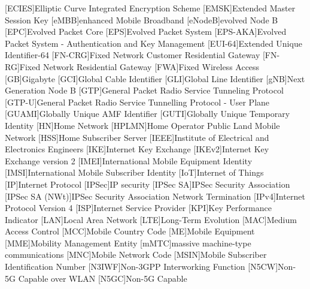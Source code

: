 \begin{multicols}{2}
\begin{acronym}[WPA]
        [ECIES]{Elliptic Curve Integrated Encryption Scheme}
        [EMSK]{Extended Master Session Key}
        [eMBB]{enhanced Mobile Broadband}
        [eNodeB]{evolved Node B}
        [EPC]{Evolved Packet Core}
        [EPS]{Evolved Packet System}
        [EPS-AKA]{Evolved Packet System - Authentication and Key Management}
        [EUI-64]{Extended Unique Identifier-64}
        [FN-CRG]{Fixed Network Customer Residential Gateway}
        [FN-RG]{Fixed Network Residential Gateway}
        [FWA]{Fixed Wireless Access}
        [GB]{Gigabyte}
        [GCI]{Global Cable Identifier}
        [GLI]{Global Line Identifier}
        [gNB]{Next Generation Node B}
        [GTP]{General Packet Radio Service Tunneling Protocol}
        [GTP-U]{General Packet Radio Service Tunnelling Protocol - User Plane}
        [GUAMI]{Globally Unique AMF Identifier}
        [GUTI]{Globally Unique Temporary Identity}
        [HN]{Home Network}
        [HPLMN]{Home Operator Public Land Mobile Network}
        [HSS]{Home Subscriber Server}
        [IEEE]{Institute of Electrical and Electronics Engineers}
        [IKE]{Internet Key Exchange}
        [IKEv2]{Internet Key Exchange version 2}
        [IMEI]{International Mobile Equipment Identity}
        [IMSI]{International Mobile Subscriber Identity}
        [IoT]{Internet of Things}
        [IP]{Internet Protocol}
        [IPSec]{IP security}
        [IPSec SA]{IPSec Security Association}
        [IPSec SA (NWt)]{IPSec Security Association Network Termination}
        [IPv4]{Internet Protocol Version 4}
        [ISP]{Internet Service Provider}
        [KPI]{Key Performance Indicator}
        [LAN]{Local Area Network}
        [LTE]{Long-Term Evolution}
        [MAC]{Medium Access Control}
        [MCC]{Mobile Country Code}
        [ME]{Mobile Equipment}
        [MME]{Mobility Management Entity}
        [mMTC]{massive machine-type communications}
        [MNC]{Mobile Network Code}
        [MSIN]{Mobile Subscriber Identification Number}
        [N3IWF]{Non-3GPP Interworking Function}
        [N5CW]{Non-5G Capable over WLAN}
        [N5GC]{Non-5G Capable}

\end{acronym}
\end{multicols}
